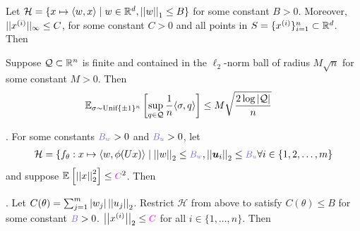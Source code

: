 \documentclass[11pt]{article}
\renewcommand\vec[2][]{\bm{#2}_{#1}}
\begin{document}
\begin{definition}
	Let $\mathcal H = \{ x \mapsto \langle w, x \rangle \mid w \in \R^d, \norm[1]{w}  \leq B  \}$ for some constant $B > 0$. Moreover,  $\inftynorm{x^{(i)}} \leq C$, for some constant $C > 0$ and all points in $S = \{ \ival[i]{x} \}_{i=1}^n \subset \R^d$. Then 
\end{definition}

\begin{definition}
	Suppose $\mathcal Q \subset \R^n$ is finite and contained in the $\ell_2$-norm ball of radius $M\sqrt{n}$ for some constant $M > 0$. Then 
	\begin{align}
		\E[\sigma  \sim \text{Unif}\{\pm 1\}^{n}]{\sup_{q \in \mathcal Q}\inv{n} \langle \sigma, q \rangle }
			&\leq M \sqrt{ \frac{2 \log |\mathcal Q| }{n} }
	\end{align}
	
\end{definition}

\begin{definition}
	. For some constants $\mblue{B_w} > 0$ and $\mblue{B_u} > 0$, let 
	\begin{align}
		\mathcal H = \{  f_{\theta}: x \mapsto \langle w , \phi(Ux) \rangle \mid \norm{w} \leq \mblue{B_w}, \norm{\vec[i]{u}} \leq \mblue{B_u}  \forall i \in \{1, 2, \ldots, m \}
	\end{align}
	and suppose $\E{ \norm{x}^2 } \leq \mpink{C}^2$. Then

	\vspace*{1em}
	. Let $C(\theta) = \sum_{j=1}^m |w_j| \norm{u_j}$. Restrict $\mathcal H$ from above to satisfy $C(\theta) \leq B$ for some constant $\mblue{B} > 0$.  $\norm{x^{(i)}} \leq \mpink{C}$ for all $i \in \{1, \ldots, n\}$. Then 
\end{definition}
\end{document}
